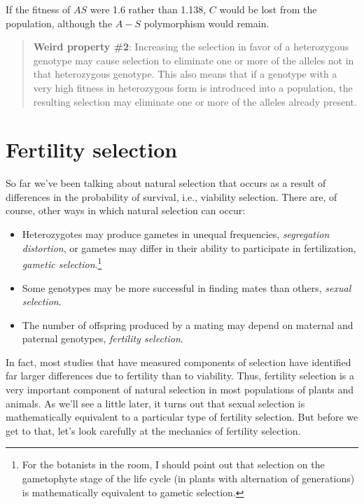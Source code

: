 \noindent If the fitness of $AS$ were 1.6 rather than 1.138, $C$ would
be lost from the population, although the $A-S$ polymorphism would
remain.

\begin{quote} {\bf Weird property \#2}: Increasing the selection in
  favor of a heterozygous genotype may cause selection to eliminate
  one or more of the alleles not in that heterozygous genotype. This
  also means that if a genotype with a very high fitness in
  heterozygous form is introduced into a population, the resulting
  selection may eliminate one or more of the alleles already present.
\end{quote}

\section*{Fertility selection}

So far we've been talking about natural selection that occurs as a
result of differences in the probability of survival, i.e., viability
selection. There are, of course, other ways in which natural selection
can occur:

\begin{itemize}

\item Heterozygotes may produce gametes in unequal frequencies, {\it
  segregation distortion}, or gametes may differ in their ability to
  participate in fertilization, {\it gametic selection}.\footnote{For
    the botanists in the room, I should point out that selection on
    the gametophyte stage of the life cycle (in plants with
    alternation of generations) is mathematically equivalent to
    gametic selection.}

\item Some genotypes may be more successful in finding mates than
  others, {\it sexual selection}.

\item The number of offspring produced by a mating may depend on
  maternal and paternal genotypes, {\it fertility selection}.

\end{itemize}

\noindent In fact, most studies that have measured components of
selection have identified far larger differences due to fertility than
to viability. Thus, fertility selection is a very important component
of natural selection in most populations of plants and animals. As
we'll see a little later, it turns out that sexual selection is
mathematically equivalent to a particular type of fertility
selection. But before we get to that, let's look carefully at the
mechanics of fertility selection.

